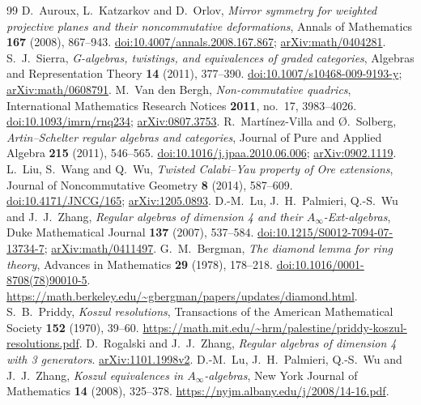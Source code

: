 \documentclass[11pt,a4paper]{ltjsarticle}
\theoremstyle{definition}
\begin{document}
\begin{thebibliography}{99}
D.~Auroux, L.~Katzarkov and D.~Orlov,
\emph{Mirror symmetry for weighted projective planes and their noncommutative deformations},
Annals of Mathematics \textbf{167} (2008), 867--943.
\href{https://doi.org/10.4007/annals.2008.167.867}{doi:10.4007/annals.2008.167.867};
\href{https://arxiv.org/abs/math/0404281}{arXiv:math/0404281}.
S.~J.~Sierra, \emph{G-algebras, twistings, and equivalences of graded categories},
Algebras and Representation Theory \textbf{14} (2011), 377--390.
\href{https://doi.org/10.1007/s10468-009-9193-y}{doi:10.1007/s10468-009-9193-y};
\href{https://arxiv.org/abs/math/0608791}{arXiv:math/0608791}.
M.~Van den Bergh, \emph{Non-commutative quadrics},
International Mathematics Research Notices \textbf{2011}, no.~17, 3983--4026.
\href{https://doi.org/10.1093/imrn/rnq234}{doi:10.1093/imrn/rnq234};
\href{https://arxiv.org/abs/0807.3753}{arXiv:0807.3753}.
R.~Mart\'inez-Villa and \O.~Solberg,
\emph{Artin--Schelter regular algebras and categories},
Journal of Pure and Applied Algebra \textbf{215} (2011), 546--565.
\href{https://doi.org/10.1016/j.jpaa.2010.06.006}{doi:10.1016/j.jpaa.2010.06.006};
\href{https://arxiv.org/abs/0902.1119}{arXiv:0902.1119}.
L.~Liu, S.~Wang and Q.~Wu, \emph{Twisted Calabi--Yau property of Ore extensions},
Journal of Noncommutative Geometry \textbf{8} (2014), 587--609.
\href{https://doi.org/10.4171/JNCG/165}{doi:10.4171/JNCG/165};
\href{https://arxiv.org/abs/1205.0893}{arXiv:1205.0893}.
D.-M.~Lu, J.~H.~Palmieri, Q.-S.~Wu and J.~J.~Zhang,
\emph{Regular algebras of dimension 4 and their $A_\infty$-Ext-algebras},
Duke Mathematical Journal \textbf{137} (2007), 537--584.
\href{https://doi.org/10.1215/S0012-7094-07-13734-7}{doi:10.1215/S0012-7094-07-13734-7};
\href{https://arxiv.org/abs/math/0411497}{arXiv:math/0411497}.
G.~M.~Bergman, \emph{The diamond lemma for ring theory},
Advances in Mathematics \textbf{29} (1978), 178--218.
\href{https://doi.org/10.1016/0001-8708(78)90010-5}{doi:10.1016/0001-8708(78)90010-5}.
\url{https://math.berkeley.edu/~gbergman/papers/updates/diamond.html}.
S.~B.~Priddy, \emph{Koszul resolutions},
Transactions of the American Mathematical Society \textbf{152} (1970), 39--60.
\url{https://math.mit.edu/~hrm/palestine/priddy-koszul-resolutions.pdf}.
D.~Rogalski and J.~J.~Zhang,
\emph{Regular algebras of dimension 4 with 3 generators}.
\href{https://arxiv.org/abs/1101.1998}{arXiv:1101.1998v2}.
D.-M.~Lu, J.~H.~Palmieri, Q.-S.~Wu and J.~J.~Zhang,
\emph{Koszul equivalences in $A_\infty$-algebras},
New York Journal of Mathematics \textbf{14} (2008), 325--378.
\url{https://nyjm.albany.edu/j/2008/14-16.pdf}.
\end{thebibliography}
\end{document}
